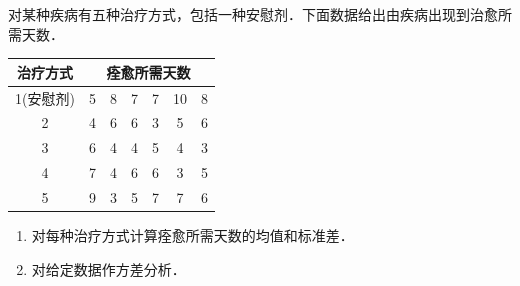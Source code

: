 \begin{homework}[2]
对某种疾病有五种治疗方式，包括一种安慰剂．下面数据给出由疾病出现到治愈所需天数．

\begin{table}[h]
\centering
\begin{tabular}{c|cccccc}
\hline
治疗方式 & \multicolumn{6}{c}{痊愈所需天数} \\
\hline
1(安慰剂) & 5 & 8 & 7 & 7 & 10 & 8 \\
2         & 4 & 6 & 6 & 3 & 5  & 6 \\
3         & 6 & 4 & 4 & 5 & 4  & 3 \\
4         & 7 & 4 & 6 & 6 & 3  & 5 \\
5         & 9 & 3 & 5 & 7 & 7  & 6 \\
\hline
\end{tabular}
\end{table}

\begin{enumerate}
    \item 对每种治疗方式计算痊愈所需天数的均值和标准差．
    \item 对给定数据作方差分析．
\end{enumerate}
\end{homework}
